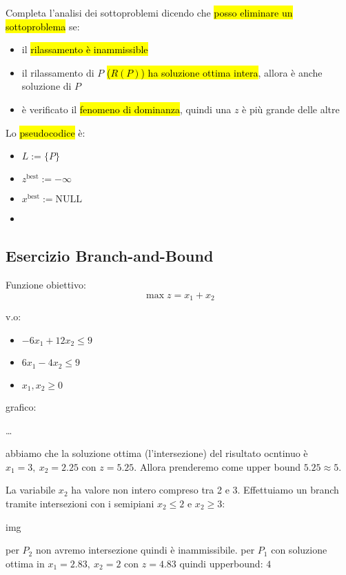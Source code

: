 Completa l'analisi dei sottoproblemi dicendo che \hl{posso eliminare un sottoproblema} se:

\begin{itemize}
    \item il \hl{rilassamento è inammissible}
    \item il rilassamento di $P$ \hl{($R(P)$) ha soluzione ottima intera}, allora è anche soluzione di $P$
    \item è verificato il \hl{fenomeno di dominanza}, quindi una $z$ è più grande delle altre
\end{itemize}

Lo \hl{pseudocodice} è:

\begin{itemize}
    \item[] $L := \{P\}$
    \item[] $z^{\text{best}} := -\infty$
    \item[] $x^{\text{best}} := \text{NULL}$
    \item[]
\end{itemize}


\subsection{Esercizio Branch-and-Bound}

Funzione obiettivo:
$$\max z = x_1 + x_2$$

v.o:

\begin{itemize}
    \item $-6x_1 + 12x_2 \leq 9$
    \item $6x_1 - 4x_2 \leq 9$
    \item $x_1, x_2 \geq 0$
\end{itemize}

grafico:

\dots

abbiamo che la soluzione ottima (l'intersezione) del risultato ocntinuo è $x_1 = 3,\ x_2 = 2.25$ con $z = 5.25$. Allora prenderemo come upper bound $5.25 \approx 5$.

La variabile $x_2$ ha valore non intero compreso tra 2 e 3. Effettuiamo un branch tramite intersezioni con i semipiani $x_2 \leq 2$ e $x_2 \geq 3$:

img

per $P_2$ non avremo intersezione quindi è inammissibile. per $P_1$ con soluzione ottima in $x_1 = 2.83,\ x_2 = 2$ con $z = 4.83$ quindi upperbound: $4$


